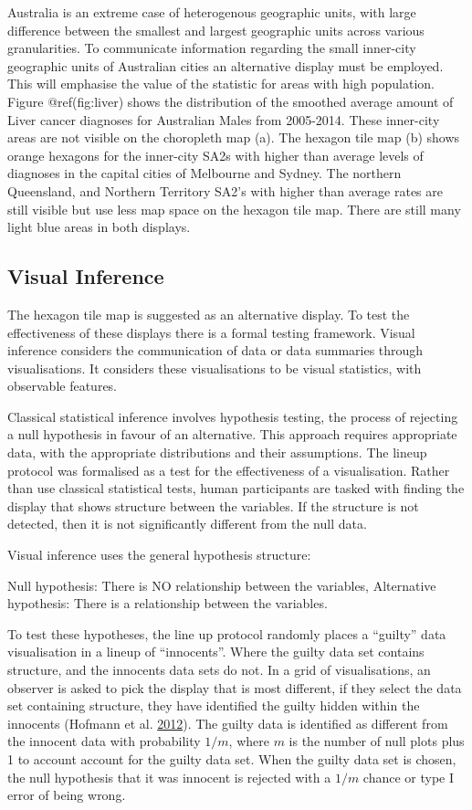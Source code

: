 \documentclass[conference,final,]{IEEEtran}
\begin{document}
Australia is an extreme case of heterogenous geographic units, with
large difference between the smallest and largest geographic units
across various granularities. To communicate information regarding the
small inner-city geographic units of Australian cities an alternative
display must be employed. This will emphasise the value of the statistic
for areas with high population. Figure @ref(fig:liver) shows the
distribution of the smoothed average amount of Liver cancer diagnoses
for Australian Males from 2005-2014. These inner-city areas are not
visible on the choropleth map (a). The hexagon tile map (b) shows orange
hexagons for the inner-city SA2s with higher than average levels of
diagnoses in the capital cities of Melbourne and Sydney. The northern
Queensland, and Northern Territory SA2's with higher than average rates
are still visible but use less map space on the hexagon tile map. There
are still many light blue areas in both displays.

\hypertarget{visual-inference}{%
\subsection{Visual Inference}\label{visual-inference}}

The hexagon tile map is suggested as an alternative display. To test the
effectiveness of these displays there is a formal testing framework.
Visual inference considers the communication of data or data summaries
through visualisations. It considers these visualisations to be visual
statistics, with observable features.

Classical statistical inference involves hypothesis testing, the process
of rejecting a null hypothesis in favour of an alternative. This
approach requires appropriate data, with the appropriate distributions
and their assumptions. The lineup protocol was formalised as a test for
the effectiveness of a visualisation. Rather than use classical
statistical tests, human participants are tasked with finding the
display that shows structure between the variables. If the structure is
not detected, then it is not significantly different from the null data.

Visual inference uses the general hypothesis structure:

Null hypothesis: There is NO relationship between the variables,
Alternative hypothesis: There is a relationship between the variables.

To test these hypotheses, the line up protocol randomly places a
``guilty'' data visualisation in a lineup of ``innocents''. Where the
guilty data set contains structure, and the innocents data sets do not.
In a grid of visualisations, an observer is asked to pick the display
that is most different, if they select the data set containing
structure, they have identified the guilty hidden within the innocents
(Hofmann et al. \protect\hyperlink{ref-GTPCCD}{2012}). The guilty data
is identified as different from the innocent data with probability
\(1/m\), where \(m\) is the number of null plots plus 1 to account
account for the guilty data set. When the guilty data set is chosen, the
null hypothesis that it was innocent is rejected with a \(1/m\) chance
or type I error of being wrong.
\end{document}
